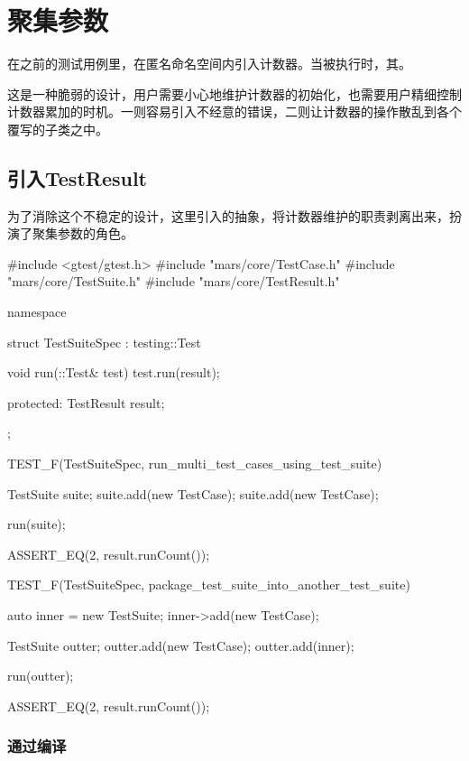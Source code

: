 \section{聚集参数}

\begin{content}

在之前的测试用例里，在匿名命名空间内引入计数器。当被执行时，其。

这是一种脆弱的设计，用户需要小心地维护计数器的初始化，也需要用户精细控制计数器累加的时机。一则容易引入不经意的错误，二则让计数器的操作散乱到各个覆写的子类之中。

\subsection{引入TestResult}

为了消除这个不稳定的设计，这里引入的抽象，将计数器维护的职责剥离出来，扮演了聚集参数的角色。

\begin{leftbar}
 \begin{c++}[caption={\ttfamily{test/mars/core/TestSuiteSpec.cc}}]
#include <gtest/gtest.h>
#include "mars/core/TestCase.h"
#include "mars/core/TestSuite.h"
#include "mars/core/TestResult.h"

namespace {
  struct TestSuiteSpec : testing::Test {
    void run(::Test& test) {
      test.run(result);
    }

  protected:
    TestResult result;
  };
}

TEST_F(TestSuiteSpec, run_multi_test_cases_using_test_suite) {
  TestSuite suite;
  suite.add(new TestCase);
  suite.add(new TestCase);

  run(suite);

  ASSERT_EQ(2, result.runCount());
}

TEST_F(TestSuiteSpec, package_test_suite_into_another_test_suite) {
  auto inner = new TestSuite;
  inner->add(new TestCase);

  TestSuite outter;
  outter.add(new TestCase);
  outter.add(inner);

  run(outter);

  ASSERT_EQ(2, result.runCount());
}
 \end{c++}
\end{leftbar}

\subsubsection{通过编译}


\end{content}
